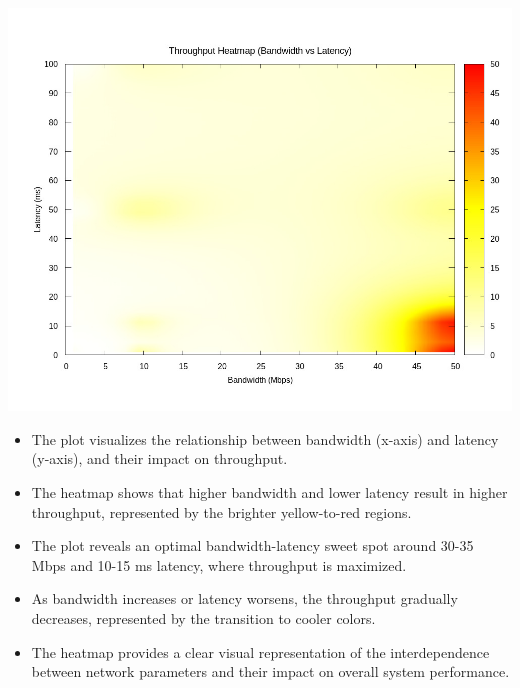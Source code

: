 \documentclass[11pt,a4paper]{article}
\begin{document}
\begin{tcolorbox}[colframe=blue!70!black, colback=blue!5!white, boxrule=0.4pt, width=\textwidth, sharp corners]
    \begin{center}
        \includegraphics[width=1\columnwidth]{images/bandwidth-latenct.jpg}
    \end{center}
    \begin{itemize}
        \item The plot visualizes the relationship between bandwidth (x-axis) and latency (y-axis), and their impact on throughput.
        \item The heatmap shows that higher bandwidth and lower latency result in higher throughput, represented by the brighter yellow-to-red regions.
        \item The plot reveals an optimal bandwidth-latency sweet spot around 30-35 Mbps and 10-15 ms latency, where throughput is maximized.
        \item As bandwidth increases or latency worsens, the throughput gradually decreases, represented by the transition to cooler colors.
        \item The heatmap provides a clear visual representation of the interdependence between network parameters and their impact on overall system performance.
    \end{itemize}
\end{tcolorbox}

\end{document}
